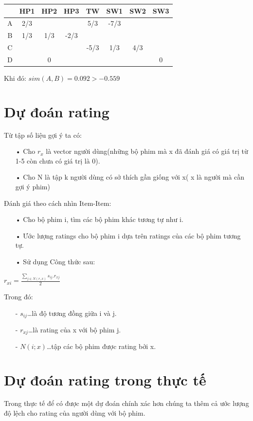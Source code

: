 \documentclass[a4paper,10pt]{report}
\begin{document}
\begin{center}
\begin{longtable}{c|ccccccc}
 & HP1 & HP2 & HP3 & TW & SW1 & SW2 & SW3 \\
 \hline
A & 2/3 & & & 5/3 & -7/3 & \\
B & 1/3 & 1/3 & -2/3 &   &  \\
C &  &   &  & -5/3 & 1/3 & 4/3\\
D &  & 0 &  &  &  &  & 0 \\
\end{longtable}
\end{center}
Khi đó: $sim(A,B) = 0.092 > -0.559$
\section{Dự đoán rating}
Từ tập số liệu gợi ý ta có:
\begin{itemize}
\item[•] Cho $r_x$ là vector người dùng(những bộ phim mà x đã đánh giá có giá trị từ 1-5 còn chưa có giá trị là 0).
\item[•] Cho N là tập k người dùng có sở thích gần giống với x( x là người mà cần gợi ý phim)
\end{itemize}
Đánh giá theo cách nhìn Item-Item:
\begin{itemize}
\item[•] Cho bộ phim i, tìm các bộ phim khác tương tự như i.
\item[•] Ước lượng ratings cho bộ phim i dựa trên ratings của các bộ phim tương tự.
\item[•] Sử dụng Công thức sau:
\end{itemize}

\begin{center}
\textbf{\huge{
$r_{xi} = \frac{\sum_{j\in N(r,x)}s_{ij}.r_{xj}}{2}$
}}
\end{center}
Trong đó:
\begin{itemize}
\item[-] $s_{ij}$\ldots là độ tương đồng giữa i và j.
\item[-] $r_{xj}$\ldots là rating của x với bộ phim j.
\item[-] $N(i;x)$\ldots tập các bộ phim được rating bởi x.
\end{itemize}
\section{Dự đoán rating trong thực tế}
Trong thực tế để có được một dự đoán chính xác hơn chúng ta thêm cả ước lượng độ lệch cho rating của người dùng với bộ phim.
\end{document}
